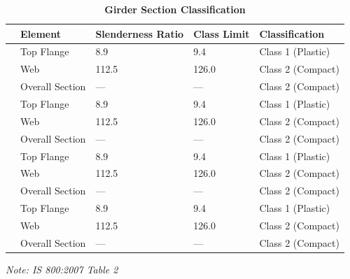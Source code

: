 \documentclass[12pt,a4paper]{report}
\numberwithin{table}{chapter}
\numberwithin{figure}{chapter}
\begin{document}
\vspace{1em}
\begin{longtable}{|C{2.5cm}|L{3cm}|C{3.5cm}|C{2.5cm}|>{\centering\arraybackslash}p{4.0cm}|}
\caption{\textbf{Girder Section Classification}}
\hline
\textbf{} & \textbf{Element} & \textbf{Slenderness Ratio} & \textbf{Class Limit} & \textbf{Classification} \\[6pt]
\hline
{} & Top Flange & 8.9 & 9.4 & Class 1 (Plastic) \\[6pt]
 & Web & 112.5 & 126.0 & Class 2 (Compact) \\[6pt]
 & Overall Section & --- & --- & Class 2 (Compact) \\[6pt]
\hline
{} & Top Flange & 8.9 & 9.4 & Class 1 (Plastic) \\[6pt]
 & Web & 112.5 & 126.0 & Class 2 (Compact) \\[6pt]
 & Overall Section & --- & --- & Class 2 (Compact) \\[6pt]
\hline
{} & Top Flange & 8.9 & 9.4 & Class 1 (Plastic) \\[6pt]
 & Web & 112.5 & 126.0 & Class 2 (Compact) \\[6pt]
 & Overall Section & --- & --- & Class 2 (Compact) \\[6pt]
\hline
{} & Top Flange & 8.9 & 9.4 & Class 1 (Plastic) \\[6pt]
 & Web & 112.5 & 126.0 & Class 2 (Compact) \\[6pt]
 & Overall Section & --- & --- & Class 2 (Compact) \\[6pt]
\hline
\end{longtable}
\noindent\textit{Note: IS 800:2007 Table 2}
\end{document}
